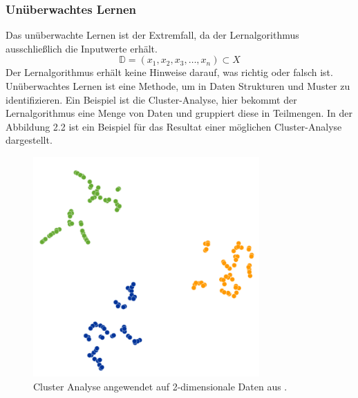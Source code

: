 \documentclass[12pt,letterpaper,ngerman]{article}
\begin{document}
\subsubsection{Unüberwachtes Lernen}
Das unüberwachte Lernen ist der Extremfall, da der Lernalgorithmus
ausschließlich die Inputwerte erhält.
\[\mathbb{D} = (x_1, x_2, x_3, \dots, x_n) \subset X\]
Der Lernalgorithmus erhält keine Hinweise darauf, was richtig oder falsch 
ist. Unüberwachtes Lernen ist eine Methode, um in Daten Strukturen und 
Muster zu identifizieren. Ein Beispiel ist die Cluster-Analyse, hier
bekommt der Lernalgorithmus eine Menge von Daten und gruppiert diese in
Teilmengen. In der Abbildung 2.2 ist ein Beispiel für das Resultat einer
möglichen Cluster-Analyse dargestellt.
\begin{figure}[H]
  \centering
  \includegraphics[scale=0.5]{abb/t-sne-example.png}
  \caption{Cluster Analyse angewendet auf 2-dimensionale Daten aus 
  \cite{wattenberg2016how}.}
\end{figure}
\end{document}
